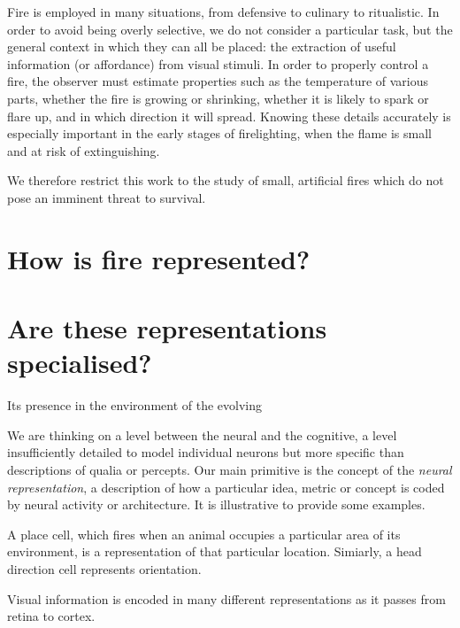 \documentclass[a4paper]{article}
\begin{document}
Fire is employed in many situations, from defensive to culinary to ritualistic. In order to avoid being overly selective, we do not consider a particular task, but the general context in which they can all be placed: the extraction of useful information (or affordance) from visual stimuli. In order to properly control a fire, the observer must estimate properties such as the temperature of various parts, whether the fire is growing or shrinking, whether it is likely to spark or flare up, and in which direction it will spread. Knowing these details accurately is especially important in the early stages of firelighting, when the flame is small and at risk of extinguishing.

We therefore restrict this work to the study of small, artificial fires which do not pose an imminent threat to survival. 

\section{How is fire represented?}




\section{Are these representations specialised?}



Its presence in the environment of the evolving 


We are thinking on a level between the neural and the cognitive, a level insufficiently detailed to model individual neurons but more specific than descriptions of qualia or percepts. Our main primitive is the concept of the \textit{neural representation}, a description of how a particular idea, metric or concept is coded by neural activity or architecture. It is illustrative to provide some examples.


A place cell, which fires when an animal occupies a particular area of its environment, is a representation of that particular location. Simiarly, a head direction cell represents orientation.

Visual information is encoded in many different representations as it passes from retina to cortex.





\begin{singlespace}
\begin{footnotesize}
\begin{twocolumn}


\end{twocolumn}
\end{footnotesize}
\end{singlespace}
\newpage


\end{document}
